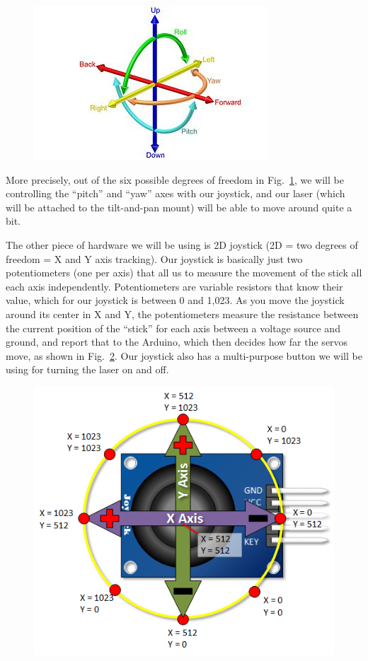 \documentclass{article}
\begin{document}
\begin{figure}[H]
  \centering
  \includegraphics[width=.7\linewidth]{figures/roll-pitch-yaw.jpg}
  \caption{\label{fig:roll-pitch-yaw}}
\end{figure}

More precisely, out of the six possible degrees of freedom in
Fig.~\ref{fig:roll-pitch-yaw}, we will be controlling the ``pitch'' and ``yaw'' axes
with our joystick, and our laser (which will be attached to the tilt-and-pan mount)
will be able to move around quite a bit.

The other piece of hardware we will be using is 2D joystick (2D = two degrees of
freedom = X and Y axis tracking). Our joystick is basically just two potentiometers
(one per axis) that all us to measure the movement of the stick all each axis
independently. Potentiometers are variable resistors that know their value, which for
our joystick is between 0 and 1,023. As you move the joystick around its center in X
and Y, the potentiometers measure the resistance between the current position of the
``stick'' for each axis between a voltage source and ground, and report that to the
Arduino, which then decides how far the servos move, as shown in
Fig.~\ref{fig:joystick-output}. Our joystick also has a multi-purpose button we will
be using for turning the laser on and off.

\begin{figure}[H]
  \centering
  \includegraphics[width=.7\linewidth]{figures/joystick-output.png}
  \caption{\label{fig:joystick-output}}
\end{figure}
\end{document}
